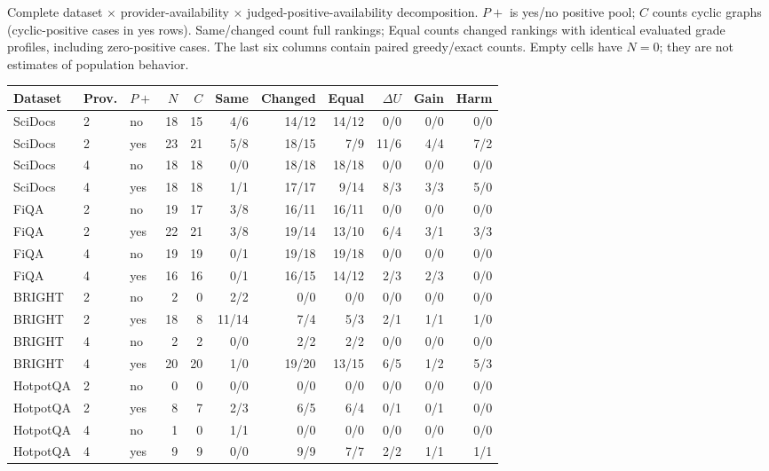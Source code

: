 \begin{supplementtable}\papertable\setlength{\tabcolsep}{3pt}
\caption{Complete dataset $\times$ provider-availability $\times$ judged-positive-availability decomposition. $P+$ is yes/no positive pool; $C$ counts cyclic graphs (cyclic-positive cases in yes rows). Same/changed count full rankings; Equal counts changed rankings with identical evaluated grade profiles, including zero-positive cases. The last six columns contain paired greedy/exact counts. Empty cells have $N=0$; they are not estimates of population behavior.}\label{tab:selected-composition-detail}
\begin{tabular}{@{}lllrrrrrrrr@{}}\toprule
Dataset & Prov. & $P+$ & $N$ & $C$ & Same & Changed & Equal & $\Delta U$ & Gain & Harm\\\midrule
SciDocs & 2 & no & 18 & 15 & 4/6 & 14/12 & 14/12 & 0/0 & 0/0 & 0/0\\
SciDocs & 2 & yes & 23 & 21 & 5/8 & 18/15 & 7/9 & 11/6 & 4/4 & 7/2\\
SciDocs & 4 & no & 18 & 18 & 0/0 & 18/18 & 18/18 & 0/0 & 0/0 & 0/0\\
SciDocs & 4 & yes & 18 & 18 & 1/1 & 17/17 & 9/14 & 8/3 & 3/3 & 5/0\\
\addlinespace[3pt]
FiQA & 2 & no & 19 & 17 & 3/8 & 16/11 & 16/11 & 0/0 & 0/0 & 0/0\\
FiQA & 2 & yes & 22 & 21 & 3/8 & 19/14 & 13/10 & 6/4 & 3/1 & 3/3\\
FiQA & 4 & no & 19 & 19 & 0/1 & 19/18 & 19/18 & 0/0 & 0/0 & 0/0\\
FiQA & 4 & yes & 16 & 16 & 0/1 & 16/15 & 14/12 & 2/3 & 2/3 & 0/0\\
\addlinespace[3pt]
BRIGHT & 2 & no & 2 & 0 & 2/2 & 0/0 & 0/0 & 0/0 & 0/0 & 0/0\\
BRIGHT & 2 & yes & 18 & 8 & 11/14 & 7/4 & 5/3 & 2/1 & 1/1 & 1/0\\
BRIGHT & 4 & no & 2 & 2 & 0/0 & 2/2 & 2/2 & 0/0 & 0/0 & 0/0\\
BRIGHT & 4 & yes & 20 & 20 & 1/0 & 19/20 & 13/15 & 6/5 & 1/2 & 5/3\\
\addlinespace[3pt]
HotpotQA & 2 & no & 0 & 0 & 0/0 & 0/0 & 0/0 & 0/0 & 0/0 & 0/0\\
HotpotQA & 2 & yes & 8 & 7 & 2/3 & 6/5 & 6/4 & 0/1 & 0/1 & 0/0\\
HotpotQA & 4 & no & 1 & 0 & 1/1 & 0/0 & 0/0 & 0/0 & 0/0 & 0/0\\
HotpotQA & 4 & yes & 9 & 9 & 0/0 & 9/9 & 7/7 & 2/2 & 1/1 & 1/1\\
\bottomrule\end{tabular}\end{supplementtable}
